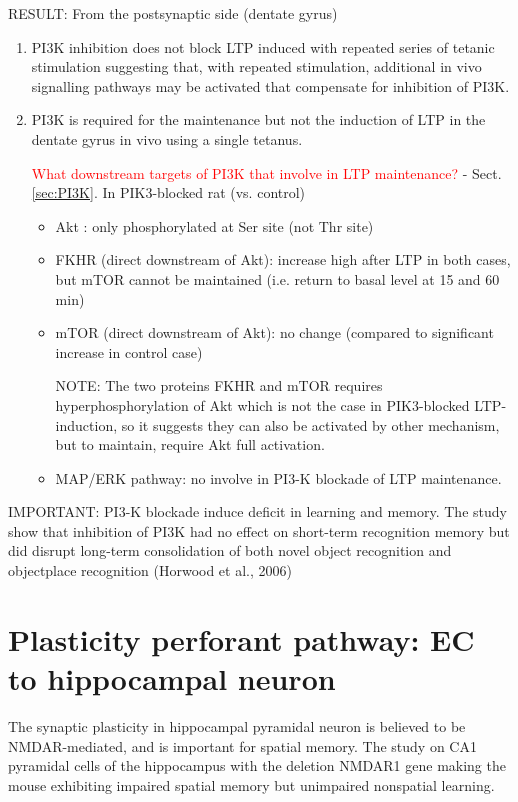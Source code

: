 RESULT: From the postsynaptic side (dentate gyrus)
\begin{enumerate}
  \item PI3K inhibition does not block LTP
induced with repeated series of tetanic stimulation suggesting that, with
repeated stimulation, additional in vivo signalling pathways may be activated
that compensate for inhibition of PI3K.

  \item PI3K is required for the maintenance but not the induction of LTP in the
dentate gyrus in vivo using a single tetanus.

\textcolor{red}{What downstream targets of PI3K that involve in LTP
maintenance?} - Sect.\ref{sec:PI3K}. In PIK3-blocked rat (vs. control)
\begin{itemize}
  \item Akt : only phosphorylated at Ser site (not Thr site)
  
  \item FKHR (direct downstream of Akt): increase high after LTP in both cases,
  but mTOR cannot be maintained (i.e. return to basal level at 15 and 60 min)
  
  \item mTOR (direct downstream of Akt): no change (compared to
  significant increase in control case)
  
NOTE: The two proteins FKHR and mTOR requires hyperphosphorylation of Akt which
is not the case in PIK3-blocked LTP-induction, so it suggests they can also be
activated by other mechanism, but to maintain, require Akt full activation.
  
  \item MAP/ERK pathway: no involve in PI3-K blockade of LTP maintenance.
\end{itemize}
\end{enumerate}

IMPORTANT: PI3-K blockade induce deficit in learning and memory.
The study show that inhibition of PI3K had no effect on short-term recognition
memory but did disrupt long-term consolidation of both novel object recognition
and objectplace recognition (Horwood et al., 2006)


\section{Plasticity perforant pathway: EC to hippocampal neuron}
\label{sec:spatial-memory}

The synaptic plasticity in hippocampal pyramidal neuron is believed to be
NMDAR-mediated, and is important for spatial memory. The study on CA1  pyramidal
cells of the hippocampus with the deletion NMDAR1 gene making the mouse
exhibiting impaired spatial memory but unimpaired nonspatial learning.

